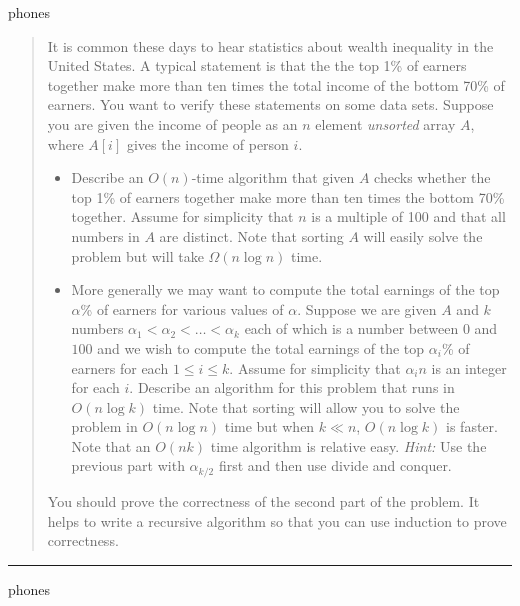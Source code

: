 \documentclass[11pt]{article}
\begin{document}
\begin{solution}
    phones
\end{solution}


\begin{quote}
    It is common these days to hear statistics about wealth inequality in
the United States. A typical statement is that the the top 1\% of
earners together make more than ten times the total income of the bottom
70\% of earners. You want to verify these statements on some data
sets. Suppose you are given the income of people as an $n$ element
\emph{unsorted} array $A$, where $A[i]$ gives the income of person
$i$.
\begin{itemize}
\item Describe an $O(n)$-time algorithm that given $A$ checks whether
  the top 1\% of earners together make more than ten times the bottom
  70\% together. Assume for simplicity that $n$ is a multiple of 100
  and that all numbers in $A$ are distinct. Note that sorting $A$ will
  easily solve the problem but will take $\Omega(n\log n)$ time.
\item More generally we may want to compute the total earnings of the
  top $\alpha$\% of earners for various values of $\alpha$. Suppose we
  are given $A$ and $k$ numbers $\alpha_1 < \alpha_2 < \ldots < \alpha_k$
  each of which is a number between $0$ and $100$ and we wish to
  compute the total earnings of the top $\alpha_i$\% of earners for
  each $1 \le i \le k$. Assume for simplicity that $\alpha_i n$ is an
  integer for each $i$. Describe an algorithm for this problem that
  runs in $O(n \log k)$ time. Note that sorting will allow you to
  solve the problem in $O(n \log n)$ time but when $k \ll n$, $O(n
  \log k)$ is faster. Note that an $O(nk)$ time algorithm is relative
  easy. {\em Hint:} Use the previous part with $\alpha_{k/2}$ first and then
  use divide and conquer.
\end{itemize}

You should prove the correctness of the second part of the problem.
It helps to write a recursive algorithm so that you can use induction
to prove correctness.

\end{quote}
\hrule



\begin{solution}
    phones
\end{solution}
\end{document}
